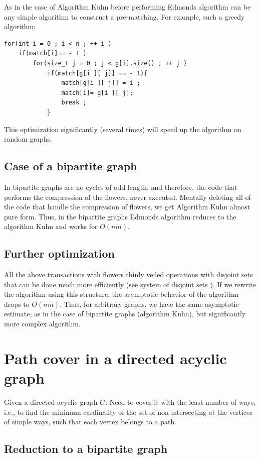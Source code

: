 As in the case of Algorithm Kuhn before performing Edmonds algorithm can be any simple algorithm to construct a pre-matching. For example, such a greedy algorithm: \begin{verbatim}
for(int i = 0 ; i < n ; ++ i )
    if(match[i]== - 1 )
        for(size_t j = 0 ; j < g[i].size() ; ++ j )
            if(match[g[i ][ j]] == - 1){
                match[g[i ][ j]] = i ;
                match[i]= g[i ][ j];
                break ;
            } 
\end{verbatim}
This optimization significantly (several times) will speed up the algorithm on random graphs.

\subsection{ Case of a bipartite graph }

In bipartite graphs are no cycles of odd length, and therefore, the code that performs the compression of the flowers, never executed. Mentally deleting all of the code that handle the compression of flowers, we get Algorithm Kuhn almost pure form. Thus, in the bipartite graphs Edmonds algorithm reduces to the algorithm Kuhn and works for $O (n m)$.

\subsection{ Further optimization }

All the above transactions with flowers thinly veiled operations with disjoint sets that can be done much more efficiently (see system of disjoint sets ). If we rewrite the algorithm using this structure, the asymptotic behavior of the algorithm drops to $O (n m)$. Thus, for arbitrary graphs, we have the same asymptotic estimate, as in the case of bipartite graphs (algorithm Kuhn), but significantly more complex algorithm.

\section{ Path cover in a directed acyclic graph }
Given a directed acyclic graph $G$. Need to cover it with the least number of ways, i.e., to find the minimum cardinality of the set of non-intersecting at the vertices of simple ways, such that each vertex belongs to a path.

\subsection{ Reduction to a bipartite graph }

